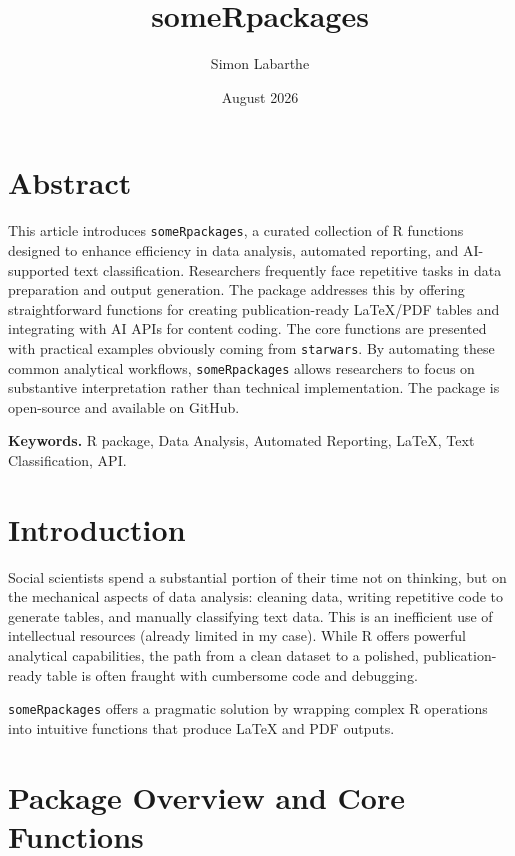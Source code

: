 \documentclass[
]{article}
\title{someRpackages}
\author{Simon Labarthe}
\date{August 2026}
\begin{document}
\maketitle

{
\setcounter{tocdepth}{2}
\tableofcontents
}
\section{Abstract}\label{abstract}

This article introduces \texttt{someRpackages}, a curated collection of
R functions designed to enhance efficiency in data analysis, automated
reporting, and AI-supported text classification. Researchers frequently
face repetitive tasks in data preparation and output generation. The
package addresses this by offering straightforward functions for
creating publication-ready LaTeX/PDF tables and integrating with AI APIs
for content coding. The core functions are presented with practical
examples obviously coming from \texttt{starwars}. By automating these
common analytical workflows, \texttt{someRpackages} allows researchers
to focus on substantive interpretation rather than technical
implementation. The package is open-source and available on GitHub.

\textbf{Keywords.} R package, Data Analysis, Automated Reporting, LaTeX,
Text Classification, API.

\newpage

\section{Introduction}\label{introduction}

Social scientists spend a substantial portion of their time not on
thinking, but on the mechanical aspects of data analysis: cleaning data,
writing repetitive code to generate tables, and manually classifying
text data. This is an inefficient use of intellectual resources (already
limited in my case). While R offers powerful analytical capabilities,
the path from a clean dataset to a polished, publication-ready table is
often fraught with cumbersome code and debugging.

\texttt{someRpackages} offers a pragmatic solution by wrapping complex R
operations into intuitive functions that produce LaTeX and PDF outputs.

\newpage

\section{Package Overview and Core
Functions}\label{package-overview-and-core-functions}
\end{document}
